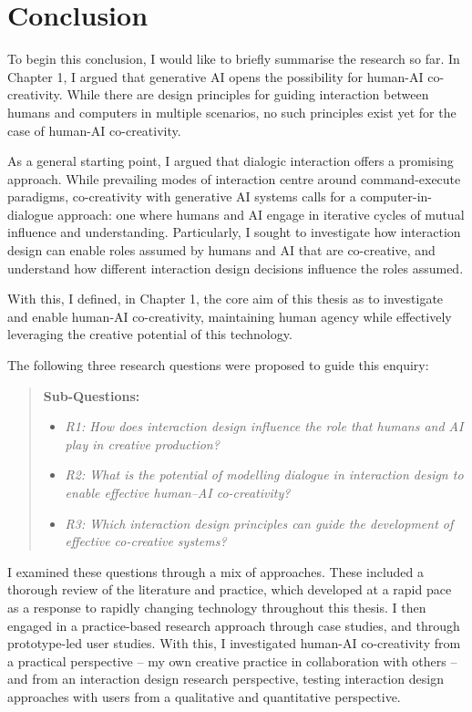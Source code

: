 \chapter[Conclusion]{Conclusion}\label{c:conclusion}

To begin this conclusion, I would like to briefly summarise the research so far. In Chapter 1, I argued that generative AI opens the possibility for human-AI co-creativity. While there are design principles for guiding interaction between humans and computers in multiple scenarios, no such principles exist yet for the case of human-AI co-creativity.

As a general starting point, I argued that dialogic interaction offers a promising approach. While prevailing modes of interaction centre around command-execute paradigms, co-creativity with generative AI systems calls for a computer-in-dialogue approach: one where humans and AI engage in iterative cycles of mutual influence and understanding. Particularly, I sought to investigate how interaction design can enable roles assumed by humans and AI that are co-creative, and understand how different interaction design decisions influence the roles assumed.

With this, I defined, in Chapter 1, the core aim of this thesis as to investigate and enable human-AI co-creativity, maintaining human agency while effectively leveraging the creative potential of this technology.

The following three research questions were proposed to guide this enquiry:

\begin{quote}
\textbf{Sub-Questions:}
\begin{itemize}
    \item \emph{R1: How does interaction design influence the role that humans and AI play in creative production?}
    \item \emph{R2: What is the potential of modelling dialogue in interaction design to enable effective human–AI co-creativity?}
    \item \emph{R3: Which interaction design principles can guide the development of effective co-creative systems?}
\end{itemize}
\end{quote}

I examined these questions through a mix of approaches. These included a thorough review of the literature and practice, which developed at a rapid pace as a response to rapidly changing technology throughout this thesis. I then engaged in a practice-based research approach through case studies, and through prototype-led user studies. With this, I investigated human-AI co-creativity from a practical perspective -- my own creative practice in collaboration with others -- and from an interaction design research perspective, testing interaction design approaches with users from a qualitative and quantitative perspective.

